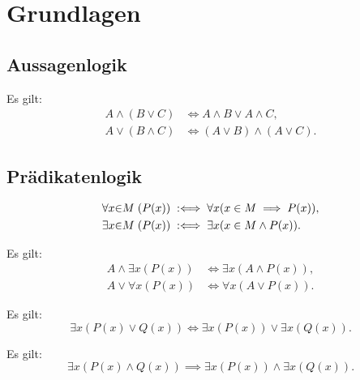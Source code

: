 
\chapter{Grundlagen}
\section{Aussagenlogik}

\begin{Satz}%
\label{bool-dl}
Es gilt:
\begin{align}
A\land (B\lor C) &\iff A\land B\lor A\land C,\\
A\lor (B\land C) &\iff (A\lor B)\land (A\lor C).
\end{align}
\end{Satz}

\section{Prädikatenlogik}

\begin{Definition}%
\label{def:bounded}
\begin{align}
\forall x{\in}M\;(P(x)) &\;:\Longleftrightarrow\; \forall x(x\in M\implies P(x)),\\
\exists x{\in}M\;(P(x)) &\;:\Longleftrightarrow\; \exists x(x\in M\land P(x)).
\end{align}
\end{Definition}

\begin{Satz}%
\label{general-dl}
Es gilt:
\begin{align}
A\land \exists x(P(x)) &\iff \exists x(A\land P(x)),\\
A\lor \forall x(P(x)) &\iff \forall x(A\lor P(x)).
\end{align}
\end{Satz}

\begin{Satz}\label{exists-dl}
Es gilt:
\[\exists x(P(x)\lor Q(x)) \iff \exists x(P(x))\lor\exists x(Q(x)).\]
\end{Satz}

\begin{Satz}\label{exists-asym-dl}
Es gilt:
\[\exists x(P(x)\land Q(x)) \implies \exists x(P(x))\land\exists x(Q(x)).\]
\end{Satz}

